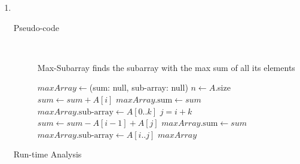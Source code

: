 \documentclass[paper=a4, fontsize=11pt]{scrartcl} %
\numberwithin{equation}{section} %
\numberwithin{figure}{section} %
\numberwithin{table}{section} %
\begin{document}
\begin{enumerate}[label=\bfseries Algorithm \arabic*:]
    \item \hfill \\
    \begin{description}
        \item[Pseudo-code] \hfill \\
        \begin{algorithmc}
            \caption{Max-Subarray finds the subarray with the max sum of all its elements}
                \State $maxArray \gets $(sum: null, sub-array: null)
                \State $n \gets A$.size
                    \State $sum \gets sum + A[i]$
                \EndFor
                \State $maxArray. \textrm{sum} \gets sum$
                \State $maxArray. \textrm{sub-array} \gets A[0..k]$
                    \State $j = i + k$
                    \State $sum \gets sum - A[i - 1] + A[j]$
                        \State $maxArray. \textrm{sum} \gets sum$
                        \State $maxArray. \textrm{sub-array} \gets A[i..j]$
                    \EndIf
                \EndFor
                \State \Return $maxArray$
            \EndFunction
        \end{algorithmc}
        \item[Run-time Analysis] \hfill \\
    \end{description}


\end{enumerate}
\end{document}

